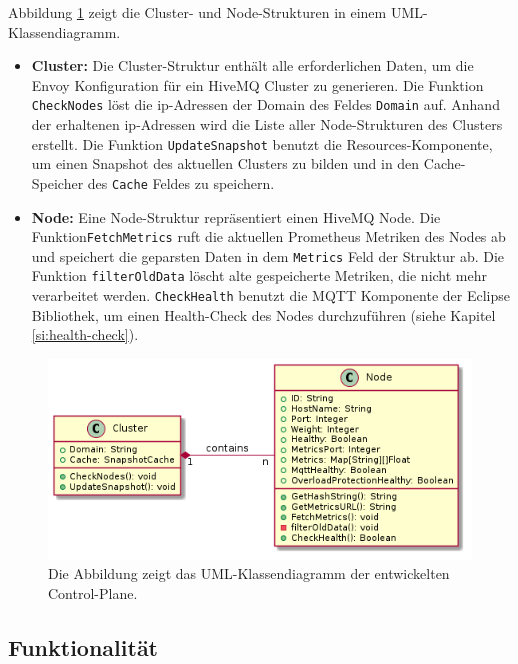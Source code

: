 Abbildung \ref{fig:class-diagram} zeigt die Cluster- und Node-Strukturen in einem UML-Klassendiagramm.
\begin{itemize}
  \item \textbf{Cluster:} Die Cluster-Struktur enthält alle erforderlichen Daten, um die Envoy Konfiguration für ein HiveMQ Cluster zu generieren. Die Funktion \verb|CheckNodes| löst die \ac{ip}-Adressen der Domain des Feldes \verb|Domain| auf. Anhand der erhaltenen \ac{ip}-Adressen wird die Liste aller Node-Strukturen des Clusters erstellt. Die Funktion \verb|UpdateSnapshot| benutzt die Resources-Komponente, um einen Snapshot des aktuellen Clusters zu bilden und in den Cache-Speicher des \verb|Cache| Feldes zu speichern.
  \item \textbf{Node:} Eine Node-Struktur repräsentiert einen HiveMQ Node. Die Funktion\newline \verb|FetchMetrics| ruft die aktuellen Prometheus Metriken des Nodes ab und speichert die geparsten Daten in dem \verb|Metrics| Feld der Struktur ab. Die Funktion \verb|filterOldData| löscht alte gespeicherte Metriken, die nicht mehr verarbeitet werden. \verb|CheckHealth| benutzt die MQTT Komponente der Eclipse Bibliothek, um einen Health-Check des Nodes durchzuführen (siehe Kapitel \ref{si:health-check}).
\end{itemize}

\begin{figure}
    \centering
    \includegraphics[scale=0.6]{gen/class.png}
    \caption{Die Abbildung zeigt das UML-Klassendiagramm der entwickelten Control-Plane.}
    \label{fig:class-diagram}
\end{figure}

\newpage
\subsection{Funktionalität}
